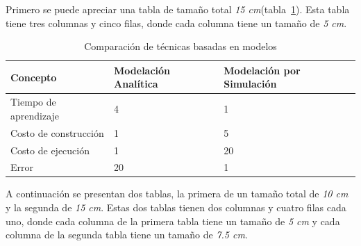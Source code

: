 \documentclass[thesis]{udpbook}
\begin{document}
\vspace{0.5cm}
\parindent=30pt Primero se puede apreciar una tabla de tamaño total \emph{15 cm}(tabla~\ref{Comparación de técnicas basadas en modelos}). Esta tabla tiene tres columnas y cinco filas, donde cada columna tiene un tamaño de \emph{5 cm}.


  \begin{table}
  \begin{center}
  \resizebox{15cm}{!} {

  \begin{tabular}{|p{5cm}|p{5cm}|p{5cm}|}

  \hline

  Concepto & Modelación Analítica & Modelación por Simulación \\

  \hline

  Tiempo de aprendizaje & 4 & 1\\



  \hline

  Costo de construcción & 1 & 5\\


  \hline

  Costo de ejecución & 1 & 20\\

  \hline

  Error & 20 & 1\\

  \hline

  \end{tabular}

  }

  \end{center}

  \caption{Comparación de técnicas basadas en modelos}

  \label{Comparación de técnicas basadas en modelos}

  \end{table} 



\vspace{0.5cm}
\parindent=30pt A continuación se presentan dos tablas, la primera de un tamaño total de \emph{10 cm} y la segunda de \emph{15 cm}. Estas dos tablas tienen dos columnas y cuatro filas cada uno, donde cada columna de la primera tabla tiene un tamaño de \emph{5 cm} y cada columna de la segunda tabla tiene un tamaño de \emph{7.5 cm}.
\end{document}
